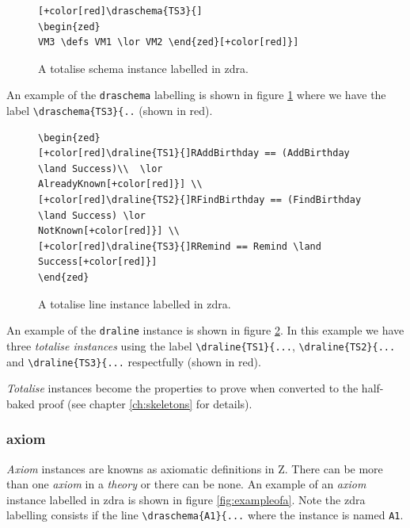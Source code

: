 \begin{figure}[H]
\centering
\begin{footnotesize}
\begin{BVerbatim}[commandchars=+\[\]]
[+color[red]\draschema{TS3}{]
\begin{zed}
VM3 \defs VM1 \lor VM2 \end{zed}[+color[red]}]
\end{BVerbatim}
\end{footnotesize}
\caption{\label{fig:exampleofts1} A totalise schema instance labelled in \gls{zdra}.}
\end{figure}

An example of the \verb|draschema| labelling is shown in figure
\ref{fig:exampleofts1} where we have the label \verb|\draschema{TS3}{..| (shown
in red).

\begin{figure}[H]
\centering
\begin{footnotesize}
\begin{BVerbatim}[commandchars=+\[\]]
\begin{zed} 
[+color[red]\draline{TS1}{]RAddBirthday == (AddBirthday \land Success)\\  \lor
AlreadyKnown[+color[red]}] \\
[+color[red]\draline{TS2}{]RFindBirthday == (FindBirthday \land Success) \lor
NotKnown[+color[red]}] \\
[+color[red]\draline{TS3}{]RRemind == Remind \land Success[+color[red]}]
\end{zed}
\end{BVerbatim}
\end{footnotesize}
\caption{\label{fig:exampleofts2} A totalise line instance labelled in \gls{zdra}.}
\end{figure}

An example of the \verb|draline| instance is shown in figure
\ref{fig:exampleofts2}. In this example we have three \emph{totalise instances}
using the label \verb|\draline{TS1}{...|, \verb|\draline{TS2}{...| and
\verb|\draline{TS3}{...| respectfully (shown in red).

\emph{Totalise} instances become the properties to prove when converted to the
half-baked proof (see chapter \ref{ch:skeletons} for details).


\subsubsection{axiom}

\emph{Axiom} instances are knowns as axiomatic definitions in Z. There can be
more than one \emph{axiom} in a \emph{theory} or there can be none. An example
of an \emph{axiom} instance labelled in \gls{zdra} is shown in figure
\ref{fig:exampleofa}. Note the \gls{zdra} labelling consists if the line
\verb|\draschema{A1}{...| where the instance is named \verb|A1|.


